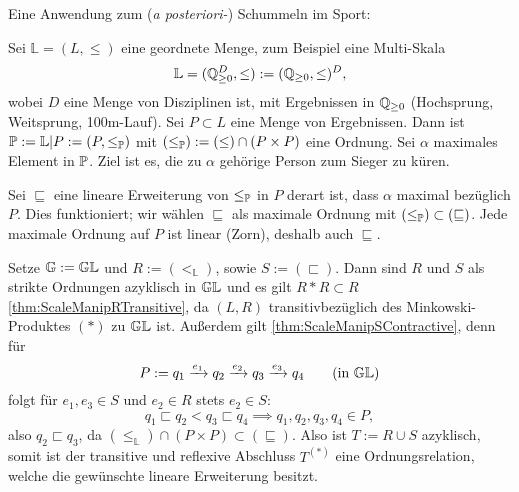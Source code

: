 Eine Anwendung zum (\emph{a posteriori-}) Schummeln im Sport:
\begin{beispiel}
    \newcommand{\Lm}{\mathbb{L}}
    Sei $\Lm = (L, \leq)$ eine geordnete Menge, zum Beispiel eine Multi-Skala
    \[
        \Lm = (\Q_{\geq 0}^D, \leq) := (\Q_{\geq 0}, \leq)^D,
    \]
    wobei $D$ eine Menge von Disziplinen ist, mit Ergebnissen in $\Q_{\geq 0}$ (Hochsprung, Weitsprung, 100m-Lauf).
    Sei $P\subset L$ eine Menge von Ergebnissen.
    Dann ist $\P := \Lm|P := (P, \leq_\P)$ mit $(\leq_\P) := (\leq) \cap (P\times P)$ eine Ordnung.
    Sei $\alpha$ maximales Element in $\P$.
    Ziel ist es, die zu $\alpha$ gehörige Person zum Sieger zu küren.

    Sei $\sqsubseteq$ eine lineare Erweiterung von $\leq_\P$ in $P$ derart ist, dass $\alpha$ maximal bezüglich $P$.
    Dies funktioniert; wir wählen $\sqsubseteq$ als maximale Ordnung mit $(\leq_\P)\subset (\sqsubseteq)$.
    Jede maximale Ordnung auf $P$ ist linear (Zorn), deshalb auch $\sqsubseteq$.

    Setze $\G := \G\Lm$ und $R := (<_\Lm)$, sowie $S := (\sqsubset)$.
    Dann sind $R$ und $S$ als strikte Ordnungen azyklisch in $\G\Lm$
    und es gilt $R*R\subset R$ \eqref{thm:ScaleManipRTransitive}, da $(L, R)$ transitivbezüglich des Minkowski-Produktes $(*)$ zu $\G\Lm$ ist.
    Außerdem gilt \eqref{thm:ScaleManipSContractive}, denn für
    \[
        P :=
            q_1 \xrightarrow{e_1}
            q_2 \xrightarrow{e_2}
            q_3 \xrightarrow{e_3}
            q_4
            \qquad\text{(in $\G\Lm$)}
    \]
    folgt für $e_1, e_3\in S$ und $e_2\in R$ stets $e_2\in S$:
    \[
        q_1 \sqsubset q_2 < q_3 \sqsubset q_4
        \implies q_1, q_2, q_3, q_4\in P,
    \]
    also $q_2\sqsubset q_3$, da $(\leq_\Lm) \cap (P\times P) \subset
    (\sqsubseteq)$.
    Also ist $T := R\cup S$ azyklisch, somit ist der transitive und reflexive Abschluss $T^{(*)}$ eine Ordnungsrelation, welche die gewünschte lineare Erweiterung besitzt.
\end{beispiel}

